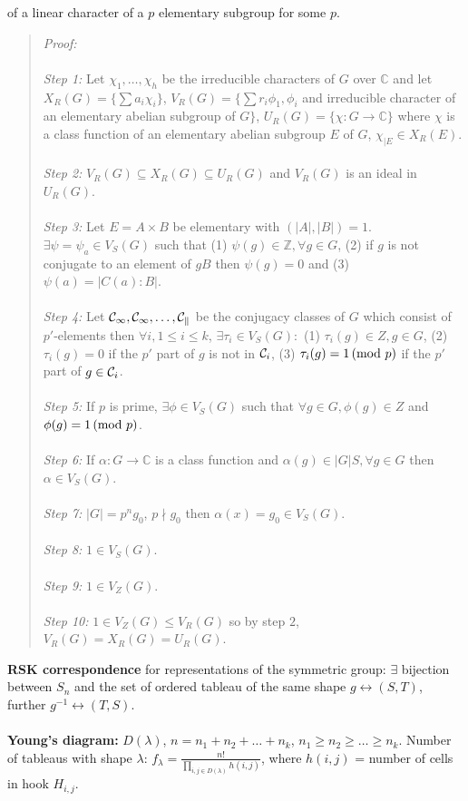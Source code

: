 {of a linear character of a $p$ elementary subgroup for some $p$.
\begin{quote}
\emph{Proof:}
\\
\\
\emph{Step 1:}  
Let $\chi_1 , \ldots , \chi_h$ be the irreducible characters of $G$
over ${\mathbb C}$ and let $X_R(G)= \{ \sum a_i \chi_i \}$,
$V_R(G) = \{ \sum r_i \phi_1 , \phi_i $ and irreducible character of an
elementary abelian subgroup of $G \}$, $U_R(G)= \{ \chi: G \rightarrow {\mathbb C} \}$ where
$\chi$ is a class function of an elementary abelian subgroup $E$ of $G$, $\chi_{|E} \in X_R(E)$.
\\
\\
\emph{Step 2:}  
$V_R(G) \subseteq X_R(G) \subseteq U_R(G)$ and $V_R(G)$ is an ideal in $U_R(G)$.
\\
\\
\emph{Step 3:}  
Let $E= A \times B$ be elementary with $(|A|, |B|)= 1$.  $\exists \psi = \psi_a \in V_S(G)$
such that (1) $\psi(g) \in {\mathbb Z}, \forall g \in G$,
(2) if $g$ is not conjugate to an element of $gB$ then $\psi(g)= 0$ and
(3) $\psi(a)= |C(a):B|$.
\\
\\
\emph{Step 4:} Let $ {\cal C_1}, {\cal C_1}, \ldots, {\cal C_k} $
be the conjugacy classes of $G$ which consist of $p'$-elements then $\forall i, 1 \le i \le k$,
$\exists \tau_i \in V_S(G):$
(1) $\tau_i(g) \in Z, g \in G$,
(2) $\tau_i(g) = 0$ if the $p'$ part of $g$ is not in ${\cal C}_i$,
(3) $\tau_i(g) = 1 \thinspace \textnormal{(mod } p \textnormal{)} $ if the $p'$ part of $g \in {\cal C}_i$.
\\
\\
\emph{Step 5:} 
If $p$ is prime, $\exists \phi \in V_S(G)$ such that $\forall g \in G, \phi(g) \in Z$ and
$\phi(g)= 1 \thinspace \textnormal{(mod } p \textnormal{)}$.
\\
\\
\emph{Step 6:} 
If $\alpha: G \rightarrow {\mathbb C}$ is a class function and $\alpha(g) \in |G|S,
\forall g \in G$ then $\alpha \in V_S(G)$.
\\
\\
\emph{Step 7:} 
$|G|= p^n g_0$, $p \nmid g_0$ then $\alpha(x)= g_0 \in V_S(G)$.
\\
\\
\emph{Step 8:} 
$1 \in V_S(G)$.
\\
\\
\emph{Step 9:} 
$1 \in V_Z(G)$.
\\
\\
\emph{Step 10:}  $1 \in V_Z(G) \le V_R(G)$ so by step $2$,
$V_R(G) = X_R(G)= U_R(G)$.
\end{quote}
{\bf RSK correspondence} for representations
of the symmetric group: $\exists$ bijection between $S_n$ and the set of ordered
tableau of the same shape $g \leftrightarrow (S,T)$, further
$g^{-1} \leftrightarrow (T,S)$.
\\
\\
{\bf Young's diagram:} $D(\lambda )$, $n= n_1 + n_2 + \ldots + n_k$,
$n_1 \geq n_2 \geq \ldots \geq n_k$.
Number of tableaus with shape $\lambda$:
$f_{ \lambda } = \frac { n!} {\prod_{i,j \in D(\lambda )} {h(i, j)}}$, where
$h(i, j)$ = number of cells in hook $H_{i,j}$.
}
